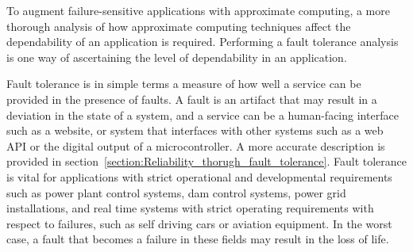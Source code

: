 To augment failure-sensitive applications with approximate computing, a more thorough analysis of how approximate computing techniques affect the dependability of an application is required. Performing a fault tolerance analysis is one way of ascertaining the level of dependability in an application.

Fault tolerance is in simple terms a measure of how well a service can be provided in the presence of faults. A fault is an artifact that may result in a deviation in the state of a system, and a service can be a human-facing interface such as a website, or system that interfaces with other systems such as a web API or the digital output of a microcontroller. A more accurate description is provided in section~\ref{section:Reliability_thorugh_fault_tolerance}. Fault tolerance is vital for applications with strict operational and developmental requirements such as power plant control systems, dam control systems, power grid installations, and real time systems with strict operating requirements with respect to failures, such as self driving cars or aviation equipment. In the worst case, a fault that becomes a failure in these fields may result in the loss of life. 






